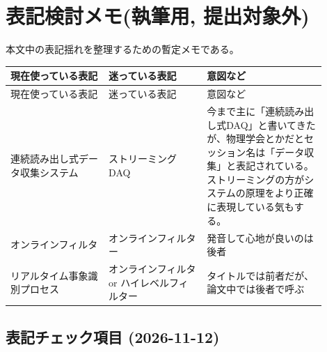 \documentclass[../main.tex]{subfiles}
\begin{document}
\begingroup
\pagestyle{empty}
\section*{表記検討メモ(執筆用, 提出対象外)}
本文中の表記揺れを整理するための暫定メモである。

\small
\setlength{\tabcolsep}{5pt}
\renewcommand{\arraystretch}{1.35}
\begin{longtable}{|p{0.28\linewidth}|p{0.28\linewidth}|p{0.34\linewidth}|}
\hline
現在使っている表記 & 迷っている表記 & 意図など \\
\hline
\endfirsthead
\hline
現在使っている表記 & 迷っている表記 & 意図など \\
\hline
\endhead

連続読み出し式データ収集システム & ストリーミングDAQ & 今まで主に「連続読み出し式DAQ」と書いてきたが、物理学会とかだとセッション名は「データ収集」と表記されている。ストリーミングの方がシステムの原理をより正確に表現している気もする。 \\
\hline

オンラインフィルタ & オンラインフィルター & 発音して心地が良いのは後者 \\
\hline

リアルタイム事象識別プロセス & オンラインフィルタ or ハイレベルフィルター & タイトルでは前者だが、論文中では後者で呼ぶ \\
\hline
\end{longtable}

\subsection*{表記チェック項目 (2026-11-12)}
\end{document}
